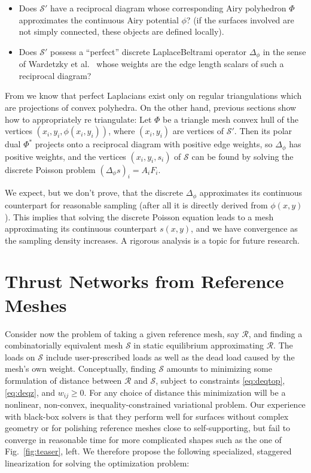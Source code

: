 \documentclass[annual]{acmsiggraph}
\def\SS{{\mathcal S}}
\def\RR{{\mathcal R}}
\begin{document}
\begin{itemize}\itemsep-\parsep

\item Does $\SS'$ have a reciprocal diagram whose corresponding Airy
polyhedron $\Phi$ approximates the continuous Airy potential $\phi$? (if
the surfaces involved are not simply connected, these objects are defined
locally).

\item Does $\SS'$ possess a ``perfect'' discrete Laplace\dash Beltrami
operator $\Delta_\phi$ in the sense of Wardetzky et
al.~ whose weights are the edge length scalars of
such a reciprocal diagram?

\end{itemize}

From \cite{wardetzky07} we know that perfect Laplacians exist only on
regular triangulations which are projections of convex polyhedra. On the
other hand, previous sections show how to appropriately re\dash
triangulate: Let $\Phi$ be a triangle mesh convex hull of the vertices
$(x_i,y_i,\phi(x_i,y_i))$, where $(x_i,y_i)$ are vertices of $\SS'$. Then
its polar dual $\Phi^*$ projects onto a reciprocal diagram with positive
edge weights, so $\Delta_\phi$ has positive weights, and the vertices
$(x_i,y_i,s_i)$ of $\SS$ can be found by solving the discrete Poisson
problem $(\Delta_\phi s)_i=A_iF_i$.

We expect, but we don't prove, that the
discrete $\Delta_\phi$
approximates its continuous counterpart for reasonable
sampling (after all it is directly derived from $\phi(x,y)$).
This implies that solving the discrete Poisson equation leads to a mesh
approximating its continuous counterpart $s(x,y)$, and we have
convergence as the sampling density increases.
A rigorous analysis is a  topic for future research.





\section{Thrust Networks from Reference Meshes} \label{sec:opt}

Consider now the problem of taking a given reference mesh, say $\RR$, and
finding a combinatorially equivalent mesh $\SS$ in static equilibrium
approximating $\RR$. The loads on $\SS$ include user-prescribed loads as
well as the dead load caused by the mesh's own weight. Conceptually,
finding $\SS$ amounts to minimizing some formulation of distance between
$\RR$ and $\SS$, subject to constraints \eqref{eq:deqtop},
\eqref{eq:deqz}, and $w_{ij} \geq 0$. For any choice of distance this
minimization will be a nonlinear, non-convex, inequality-constrained
variational problem. Our experience with black-box solvers 
\cite{ipopt} is that
they perform well for surfaces without complex geometry or for
polishing reference meshes close to self-supporting, but fail to converge
in reasonable time for more complicated shapes such as the one of
Fig.~\ref{fig:teaser}, left.
We therefore propose the following specialized, staggered linearization for solving the optimization problem:
\end{document}
